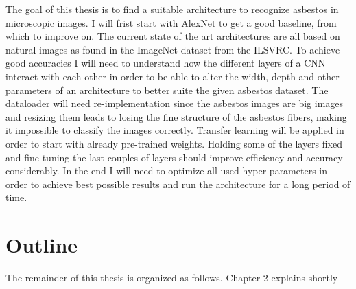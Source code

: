 The goal of this thesis is to find a suitable architecture to recognize asbestos in microscopic images. I will frist start with AlexNet to get a good baseline, from which to improve on. The current state of the art architectures are all based on natural images as found in the ImageNet dataset from the ILSVRC. To achieve good accuracies I will need to understand how the different layers of a CNN interact with each other in order to be able to alter the width, depth and other parameters of an architecture to better suite the given asbestos dataset. The dataloader will need re-implementation since the asbestos images are big images and resizing them leads to losing the fine structure of the asbestos fibers, making it impossible to classify the images correctly. Transfer learning will be applied in order to start with already pre-trained weights. Holding some of the layers fixed and fine-tuning the last couples of layers should improve efficiency and accuracy considerably. In the end I will need to optimize all used hyper-parameters in order to achieve best possible results and run the architecture for a long period of time.

\section{Outline}

The remainder of this thesis is organized as follows. Chapter 2 explains shortly 
